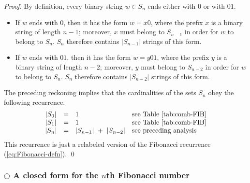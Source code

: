 \begin{proof}
By definition, every binary string $w \in S_n$ ends either with $0$ or with $01$.
\begin{itemize}
\item
If $w$ ends with $0$, then it has the form $w = x0$, where the prefix $x$ is a binary string of length $n-1$; moreover, $x$ must belong to $S_{n-1}$ in order for $w$ to belong to $S_n$.  $S_n$ therefore contains $|S_{n-1}|$ strings of this form.

\medskip\item
If $w$ ends with $01$, then it has the form $w = y01$, where the prefix $y$ is a binary string of length $n-2$; moreover, $y$ must belong to $S_{n-2}$ in order for $w$ to belong to $S_n$.  $S_n$ therefore contains $|S_{n-2}|$ strings of this form.
\end{itemize}

The preceding reckoning implies that the cardinalities of the sets $S_n$ obey the following recurrence.
\[
\begin{array}{ccll}
|S_0| & = & 1 & \mbox{see Table~\ref{tab:comb-FIB}} \\
|S_1| & = & 1 & \mbox{see Table~\ref{tab:comb-FIB}} \\
|S_n| & = & |S_{n-1}| \ + \ |S_{n-2}| & \mbox{see preceding analysis}
\end{array}
\]
This recurrence is just a relabeled version of the Fibonacci recurrence (\ref{eq:Fibonacci-defn}).  \qed
\end{proof}



\subsubsection{$\oplus$ A closed form for the $n$th Fibonacci number}
\label{sec:Fib-Golden-Ratio}

